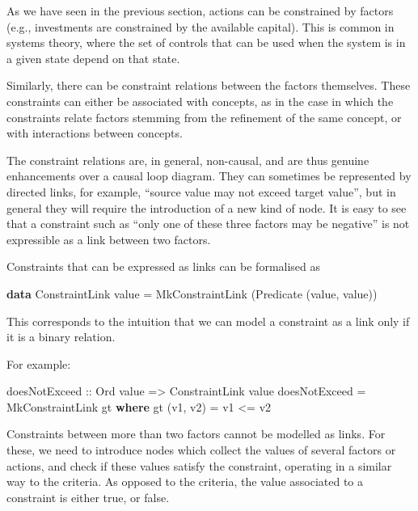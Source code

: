 \documentclass[]{article}
\newenvironment{Shaded}{}{}
\newcommand{\KeywordTok}[1]{\textcolor[rgb]{0.00,0.44,0.13}{\textbf{{#1}}}}
\newcommand{\DataTypeTok}[1]{\textcolor[rgb]{0.56,0.13,0.00}{{#1}}}
\newcommand{\OtherTok}[1]{\textcolor[rgb]{0.00,0.44,0.13}{{#1}}}
\newcommand{\FunctionTok}[1]{\textcolor[rgb]{0.02,0.16,0.49}{{#1}}}
\newcommand{\NormalTok}[1]{{#1}}
\begin{document}
As we have seen in the previous section, actions can be constrained by
factors (e.g., investments are constrained by the available capital).
This is common in systems theory, where the set of controls that can be
used when the system is in a given state depend on that state.

Similarly, there can be constraint relations between the factors
themselves. These constraints can either be associated with concepts, as
in the case in which the constraints relate factors stemming from the
refinement of the same concept, or with interactions between concepts.

The constraint relations are, in general, non-causal, and are thus
genuine enhancements over a causal loop diagram. They can sometimes be
represented by directed links, for example, ``source value may not
exceed target value'', but in general they will require the introduction
of a new kind of node. It is easy to see that a constraint such as
``only one of these three factors may be negative'' is not expressible
as a link between two factors.

Constraints that can be expressed as links can be formalised as

\begin{Shaded}
\begin{Highlighting}[]
\KeywordTok{data} \DataTypeTok{ConstraintLink} \NormalTok{value  }\FunctionTok{=}  \DataTypeTok{MkConstraintLink} \NormalTok{(}\DataTypeTok{Predicate} \NormalTok{(value, value))}
\end{Highlighting}
\end{Shaded}

This corresponds to the intuition that we can model a constraint as a
link only if it is a binary relation.

For example:

\begin{Shaded}
\begin{Highlighting}[]
doesNotExceed             \OtherTok{::}  \DataTypeTok{Ord} \NormalTok{value }\OtherTok{=>} \DataTypeTok{ConstraintLink} \NormalTok{value}
\NormalTok{doesNotExceed              }\FunctionTok{=}  \DataTypeTok{MkConstraintLink} \NormalTok{gt}
                              \KeywordTok{where}
                              \NormalTok{gt (v1, v2) }\FunctionTok{=} \NormalTok{v1 }\FunctionTok{<=} \NormalTok{v2}
\end{Highlighting}
\end{Shaded}

Constraints between more than two factors cannot be modelled as links.
For these, we need to introduce nodes which collect the values of
several factors or actions, and check if these values satisfy the
constraint, operating in a similar way to the criteria. As opposed to
the criteria, the value associated to a constraint is either true, or
false.
\end{document}

